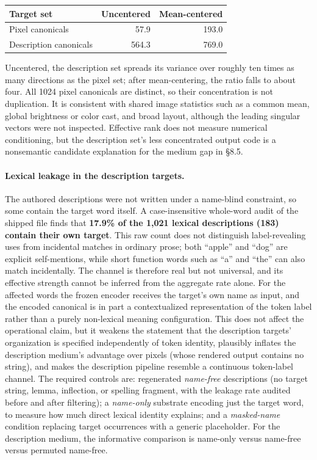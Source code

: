 \documentclass[11pt,a4paper]{article}
\begin{document}
\begin{center}\small
\begin{tabular}{lrr}
\toprule
Target set & Uncentered & Mean-centered \\
\midrule
Pixel canonicals       &  57.9 & 193.0 \\
Description canonicals & 564.3 & 769.0 \\
\bottomrule
\end{tabular}
\end{center}

\noindent Uncentered, the description set spreads its variance over roughly ten times as many directions as the pixel set; after mean-centering, the ratio falls to about four. All 1024 pixel canonicals are distinct, so their concentration is not duplication. It is consistent with shared image statistics such as a common mean, global brightness or color cast, and broad layout, although the leading singular vectors were not inspected. Effective rank does not measure numerical conditioning, but the description set's less concentrated output code is a nonsemantic candidate explanation for the medium gap in §8.5.

\paragraph{Lexical leakage in the description targets.} The authored descriptions were not written under a name-blind constraint, so some contain the target word itself. A case-insensitive whole-word audit of the shipped file finds that \textbf{17.9\% of the 1,021 lexical descriptions (183) contain their own target}. This raw count does not distinguish label-revealing uses from incidental matches in ordinary prose; both ``apple'' and ``dog'' are explicit self-mentions, while short function words such as ``a'' and ``the'' can also match incidentally. The channel is therefore real but not universal, and its effective strength cannot be inferred from the aggregate rate alone. For the affected words the frozen encoder receives the target's own name as input, and the encoded canonical is in part a contextualized representation of the token label rather than a purely non-lexical meaning configuration. This does not affect the operational claim, but it weakens the statement that the description targets' organization is specified independently of token identity, plausibly inflates the description medium's advantage over pixels (whose rendered output contains no string), and makes the description pipeline resemble a continuous token-label channel. The required controls are: regenerated \emph{name-free} descriptions (no target string, lemma, inflection, or spelling fragment, with the leakage rate audited before and after filtering); a \emph{name-only} substrate encoding just the target word, to measure how much direct lexical identity explains; and a \emph{masked-name} condition replacing target occurrences with a generic placeholder. For the description medium, the informative comparison is name-only versus name-free versus permuted name-free.
\end{document}
